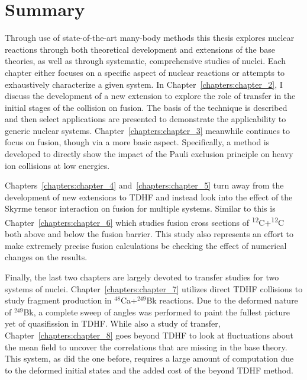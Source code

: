 \section*{Summary}

Through use of state-of-the-art many-body methods this thesis explores nuclear reactions through both theoretical development and extensions of the base theories, as well as through systematic, comprehensive studies of nuclei.
Each chapter either focuses on a specific aspect of nuclear reactions or attempts to exhaustively characterize a given system.
In Chapter~\ref{chapters:chapter_2}, I discuss the development of a new extension to explore the role of transfer in the initial stages of the collision on fusion.
The basis of the technique is described and then select applications are presented to demonstrate the applicability to generic nuclear systems.
Chapter~\ref{chapters:chapter_3} meanwhile continues to focus on fusion, though via a more basic aspect.
Specifically, a method is developed to directly show the impact of the Pauli exclusion principle on heavy ion collisions at low energies.


Chapters~\ref{chapters:chapter_4} and~\ref{chapters:chapter_5} turn away from the development of new extensions to TDHF and instead look into the effect of the Skyrme tensor interaction on fusion for multiple systems.
Similar to this is Chapter~\ref{chapters:chapter_6} which studies fusion cross sections of \textsuperscript{12}C+\textsuperscript{12}C both above and below the fusion barrier.
This study also represents an effort to make extremely precise fusion calculations be checking the effect of numerical changes on the results.

Finally, the last two chapters are largely devoted to transfer studies for two systems of nuclei.
Chapter~\ref{chapters:chapter_7} utilizes direct TDHF collisions to study fragment production in $^{48}$Ca+$^{249}$Bk reactions.
Due to the deformed nature of $^{249}$Bk, a complete sweep of angles was performed to paint the fullest picture yet of quasifission in TDHF.
While also a study of transfer, Chapter~\ref{chapters:chapter_8} goes beyond TDHF to look at fluctuations about the mean field to uncover the correlations that are missing in the base theory.
This system, as did the one before, requires a large amount of computation due to the deformed initial states and the added cost of the beyond TDHF method.




\clearpage
